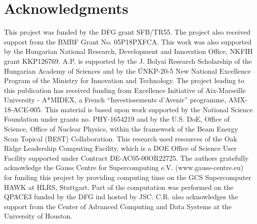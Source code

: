 \documentclass[a4paper,11pt]{article}
\begin{document}
\section*{Acknowledgments}
This project was funded by the DFG grant SFB/TR55.
The project also received support from the BMBF Grant No. 05P18PXFCA.
This work was also supported by
the Hungarian National Research,  Development and Innovation Office, NKFIH
grant KKP126769. A.P. is supported by the J. Bolyai Research
Scholarship of the Hungarian Academy of Sciences and by the \'UNKP-20-5 New
National Excellence Program of the Ministry for Innovation and Technology.
The project leading to this publication has received funding from
Excellence Initiative of
Aix-Marseille University - A*MIDEX, a French ``Investissements d'Avenir''
programme, AMX-18-ACE-005.
This  material is based upon  work  supported  by  the National  Science
Foundation under grants no. PHY-1654219 and by the U.S. DoE, %
Office  of  Science,  Office  of  Nuclear  Physics, within the framework of the
Beam Energy Scan Topical (BEST) Collaboration.  
This research used resources of the Oak Ridge Leadership Computing Facility, which is a DOE Office of Science User Facility supported under Contract DE-AC05-00OR22725. 
The authors gratefully
acknowledge the Gauss Centre for Supercomputing e.V.  (www.gauss-centre.eu) for
funding this project by providing computing time on the GCS Supercomputer
HAWK at HLRS, Stuttgart. 
Part of the computation was performed on the QPACE3 funded by the DFG ind
hosted by JSC.
C.R. also acknowledges the support from the Center of Advanced
Computing and Data Systems at the University of Houston.
\end{document}
